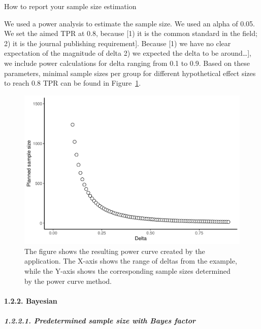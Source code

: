 \documentclass[
  english,
  man,floatsintext]{apa6}
\let\oldparagraph\paragraph
\renewcommand{\paragraph}[1]{\oldparagraph{#1}\mbox{}}
\let\oldsubparagraph\subparagraph
\renewcommand{\subparagraph}[1]{\oldsubparagraph{#1}\mbox{}}
\begin{document}
How to report your sample size estimation

We used a power analysis to estimate the sample size. We used an alpha of 0.05. We set the aimed TPR at 0.8, because {[}1) it is the common standard in the field; 2) it is the journal publishing requirement{]}. Because {[}1) we have no clear expectation of the magnitude of delta 2) we expected the delta to be around\ldots{]}, we include power calculations for delta ranging from 0.1 to 0.9. Based on these parameters, minimal sample sizes per group for different hypothetical effect sizes to reach 0.8 TPR can be found in Figure~\ref{fig:powercurve}.

\begin{figure}

{\centering \includegraphics{manuscript_files/figure-latex/powercurve-1} 

}

\caption{The figure shows the resulting power curve created by the application. The X-axis shows the range of deltas from the example, while the Y-axis shows the corresponding sample sizes determined by the power curve method.}\label{fig:powercurve}
\end{figure}



\hypertarget{bayesian}{%
\paragraph{1.2.2. Bayesian}\label{bayesian}}

\hypertarget{predetermined-sample-size-with-bayes-factor}{%
\subparagraph{1.2.2.1. Predetermined sample size with Bayes factor}\label{predetermined-sample-size-with-bayes-factor}}
\end{document}
